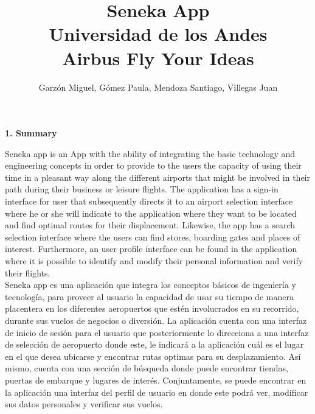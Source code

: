 \documentclass[]{article}
\begin{document}
\title{Seneka App\\
Universidad de los Andes\\
Airbus Fly Your Ideas}
\author{Garzón Miguel, Gómez Paula, Mendoza Santiago, Villegas Juan}
\maketitle


\Large{
\textbf{1. Summary}\\
}

Seneka app is an App with the ability of integrating the basic technology and engineering concepts in order to provide to the users the capacity of using their time in a pleasant way along the different airports that might be involved in their path during their business or leisure flights. The application has a sign-in interface for user that subsequently directs it to an airport selection interface where he or she will indicate to the application where they want to be located and find optimal routes for their displacement. Likewise, the app has a search selection interface where the users can find stores, boarding gates and places of interest. Furthermore, an user profile interface can be found in the application where it is possible to identify and modify their personal information and verify their flights.\\

Seneka app es una aplicación que integra los conceptos básicos de ingeniería y tecnología, para proveer al usuario la capacidad de usar su tiempo de manera placentera en los diferentes aeropuertos que estén involucrados en su recorrido, durante sus vuelos de negocios o diversión. La aplicación cuenta con una interfaz de inicio de sesión para el usuario que posteriormente lo direcciona a una interfaz de selección de aeropuerto donde este, le indicará a la aplicación cuál es el lugar en el que desea ubicarse y encontrar rutas optimas para su desplazamiento. Así mismo, cuenta con una sección de búsqueda donde puede encontrar tiendas, puertas de embarque y lugares de interés. Conjuntamente, se puede encontrar en la aplicación una interfaz del perfil de usuario en donde este podrá ver, modificar sus datos personales y verificar sus vuelos.
\end{document}
